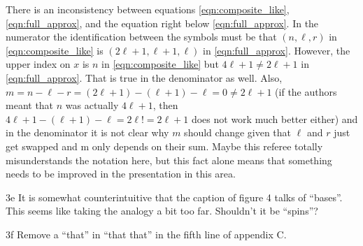 \begin{point}{}
There is an inconsistency between equations \eqref{eqn:composite_like}, \eqref{eqn:full_approx},
and the equation right below \eqref{eqn:full_approx}. In the numerator the identification between
the symbols must be that $(n,\ell,r)$
in \eqref{eqn:composite_like} is $(2\ell+1,\ell+1, \ell)$ in \eqref{eqn:full_approx}.
However, the upper index on $x$ is $n$ in \eqref{eqn:composite_like}
but $4\ell+1 \neq 2\ell+1$ in \eqref{eqn:full_approx}.
That is true in the denominator as well. Also,
$m=n-\ell-r=(2\ell+1)-(\ell+1)-\ell=0 \neq 2\ell+1$
(if the authors meant that $n$ was
actually $4\ell+1$, then $4\ell+1-(\ell+1)-\ell=2\ell != 2\ell+1$ does not work much better
either) and in the denominator it is not clear why $m$ should change
given that $\ell$ and $r$ just get swapped and m only depends on their sum.
Maybe this referee totally misunderstands the notation here, but this
fact alone means that something needs to be improved in the
presentation in this area.
\end{point}


\begin{point}{3e}
It is somewhat counterintuitive that the caption of figure 4 talks
of ``bases''. This seems like taking the analogy a bit too far.
Shouldn't it be ``spins''?
\end{point}


\begin{point}{3f}
Remove a ``that'' in ``that that'' in the fifth line of appendix C.
\end{point}

